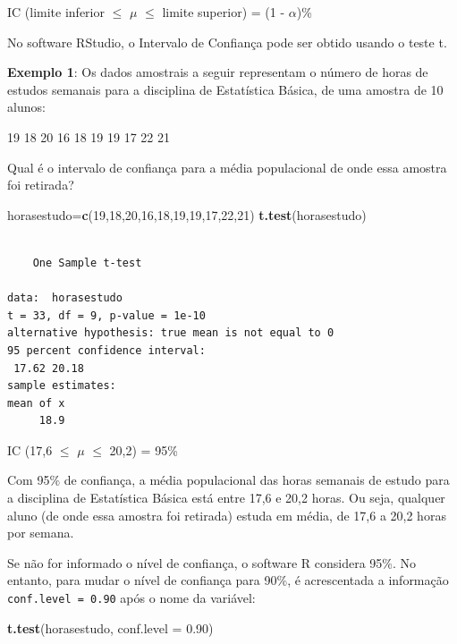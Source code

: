 \documentclass[12pt,brazil,oneside]{book}
\newenvironment{Shaded}{\begin{snugshade}}{\end{snugshade}}
\newcommand{\DataTypeTok}[1]{\textcolor[rgb]{0.13,0.29,0.53}{#1}}
\newcommand{\DecValTok}[1]{\textcolor[rgb]{0.00,0.00,0.81}{#1}}
\newcommand{\FloatTok}[1]{\textcolor[rgb]{0.00,0.00,0.81}{#1}}
\newcommand{\KeywordTok}[1]{\textcolor[rgb]{0.13,0.29,0.53}{\textbf{#1}}}
\newcommand{\NormalTok}[1]{#1}
\begin{document}
IC (limite inferior \(\leq\) \(\mu\) \(\leq\) limite superior) = (1 - \(\alpha\))\%

No software RStudio, o Intervalo de Confiança pode ser obtido usando o teste t.

\textbf{Exemplo 1}: Os dados amostrais a seguir representam o número de horas de estudos semanais para a disciplina de Estatística Básica, de uma amostra de 10 alunos:

19 18 20 16 18 19 19 17 22 21

Qual é o intervalo de confiança para a média populacional de onde essa amostra foi retirada?

\begin{Shaded}
\begin{Highlighting}[]
\NormalTok{horasestudo=}\KeywordTok{c}\NormalTok{(}\DecValTok{19}\NormalTok{,}\DecValTok{18}\NormalTok{,}\DecValTok{20}\NormalTok{,}\DecValTok{16}\NormalTok{,}\DecValTok{18}\NormalTok{,}\DecValTok{19}\NormalTok{,}\DecValTok{19}\NormalTok{,}\DecValTok{17}\NormalTok{,}\DecValTok{22}\NormalTok{,}\DecValTok{21}\NormalTok{)}
\KeywordTok{t.test}\NormalTok{(horasestudo)}
\end{Highlighting}
\end{Shaded}

\begin{verbatim}

    One Sample t-test

data:  horasestudo
t = 33, df = 9, p-value = 1e-10
alternative hypothesis: true mean is not equal to 0
95 percent confidence interval:
 17.62 20.18
sample estimates:
mean of x 
     18.9 
\end{verbatim}

IC (17,6 \(\leq\) \(\mu\) \(\leq\) 20,2) = 95\%

Com 95\% de confiança, a média populacional das horas semanais de estudo para a disciplina de Estatística Básica está entre 17,6 e 20,2 horas. Ou seja, qualquer aluno (de onde essa amostra foi retirada) estuda em média, de 17,6 a 20,2 horas por semana.

Se não for informado o nível de confiança, o software R considera 95\%. No entanto, para mudar o nível de confiança para 90\%, é acrescentada a informação \texttt{conf.level\ =\ 0.90} após o nome da variável:

\begin{Shaded}
\begin{Highlighting}[]
\KeywordTok{t.test}\NormalTok{(horasestudo, }\DataTypeTok{conf.level =} \FloatTok{0.90}\NormalTok{)}
\end{Highlighting}
\end{Shaded}
\end{document}
